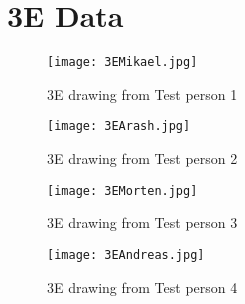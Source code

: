 \chapter{3E Data}\label{app:3E}
\begin{figure}[h]
\centering
\texttt{[image: 3EMikael.jpg]}
\caption{3E drawing from Test person 1}
\label{fig:3EMikael}
\end{figure}

\begin{figure}[h]
\centering
\texttt{[image: 3EArash.jpg]}
\caption{3E drawing from Test person 2}
\label{fig:3EArash}
\end{figure}

\begin{figure}[h]
\centering
\texttt{[image: 3EMorten.jpg]}
\caption{3E drawing from Test person 3}
\label{fig:3EMorten}
\end{figure}

\begin{figure}[h]
\centering
\texttt{[image: 3EAndreas.jpg]}
\caption{3E drawing from Test person 4}
\label{fig:3EAndreas}
\end{figure}